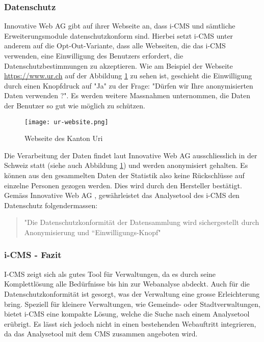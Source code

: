 \newpage

\subsubsection{Datenschutz}
Innovative Web AG gibt auf ihrer Webseite \parencite{iwebwebsiteKanotonWeb} an, dass i-CMS und sämtliche Erweiterungsmodule datenschutzkonform sind. Hierbei setzt i-CMS unter anderem auf die Opt-Out-Variante, dass alle Webseiten, die das i-CMS verwenden, eine Einwilligung des Benutzers erfordert, die Datenschutzbestimmungen zu akzeptieren. Wie am Beispiel der Webseite \url{https://www.ur.ch} auf der Abbildung \ref{fig: urweb} zu sehen ist, geschieht die Einwilligung durch einen Knopfdruck auf "Ja" zu der Frage: "Dürfen wir Ihre anonymisierten Daten verwenden ?". Es werden weitere Massnahmen unternommen, die Daten der Benutzer so gut wie möglich zu schützen.

\begin{figure}[h]
  \centering
  \texttt{[image: ur-website.png]}
  \caption{Webseite des Kanton Uri \parencite{webseiteKantonUri}}
  \label{fig: urweb}
\end{figure}

Die Verarbeitung der Daten findet laut Innovative Web AG \parencite{iwebwebsiteCMS} ausschliesslich in der Schweiz statt (siehe auch Abbildung \ref{fig: urweb}) und werden anonymisiert gehalten. Es können aus den gesammelten Daten der Statistik also keine Rückschlüsse auf einzelne Personen gezogen werden. Dies wird durch den Hersteller bestätigt. Gemäss Innovative Web AG  \parencite{email}, gewährleistet das Analysetool des i-CMS den Datenschutz folgendermassen:

\begin{quote}
  "Die Datenschutzkonformität der Datensammlung wird sichergestellt durch Anonymisierung und “Einwilligungs-Knopf"
\end{quote}

\subsubsection{i-CMS - Fazit}

I-CMS zeigt sich als gutes Tool für Verwaltungen, da es durch seine Komplettlösung alle Bedürfnisse bis hin zur Webanalyse abdeckt. Auch für die Datenschutzkonformität ist gesorgt, was der Verwaltung eine grosse Erleichterung bring. Speziell für kleinere Verwaltungen, wie Gemeinde- oder Stadtverwaltungen, bietet i-CMS eine kompakte Lösung, welche die Suche nach einem Analysetool erübrigt. Es lässt sich jedoch nicht in einen bestehenden Webauftritt integrieren, da das Analysetool mit dem CMS zusammen angeboten wird. 


